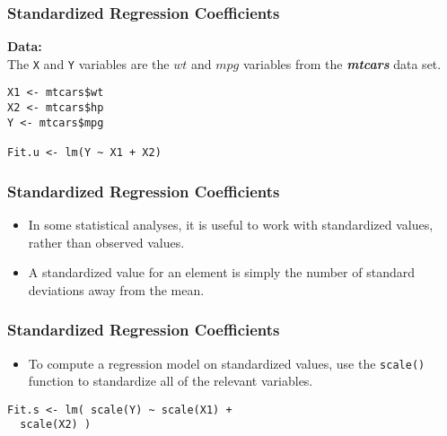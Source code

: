 \documentclass{beamer}
\begin{document}
\begin{frame}[fragile]
\frametitle{Standardized Regression Coefficients}
\Large
\vspace{-1cm}
\textbf{Data:} \\
The \texttt{X} and \texttt{Y} variables are the $wt$ and $mpg$ variables from the \textit{\textbf{\textit{mtcars}}} data set.

\begin{framed}
\begin{verbatim}
X1 <- mtcars$wt
X2 <- mtcars$hp
Y <- mtcars$mpg

Fit.u <- lm(Y ~ X1 + X2)
\end{verbatim}
\end{framed}
\end{frame}

\begin{frame}[fragile]
\frametitle{Standardized Regression Coefficients}
\Large
\vspace{-1cm}

\begin{itemize}
\item In some statistical analyses, it is useful to work with standardized values, rather than observed values.
\item A standardized value for an element is simply the number of standard deviations away from the mean.
\end{itemize}
\end{frame}

\begin{frame}[fragile]
\frametitle{Standardized Regression Coefficients}
\Large
\vspace{-1cm}

\begin{itemize}
\item To compute a regression model on standardized values, use the \texttt{scale()} function to standardize all of the relevant variables.
\end{itemize}
\begin{framed}
\begin{verbatim}
Fit.s <- lm( scale(Y) ~ scale(X1) +
  scale(X2) )
\end{verbatim}
\end{framed}
\end{frame}
\end{document}
